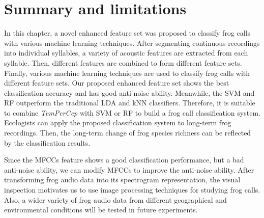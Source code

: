 \section{Summary and limitations}
In this chapter, a novel enhanced feature set was proposed to classify frog calls with various machine learning techniques. After segmenting continuous recordings into individual syllables, a variety of acoustic features are extracted from each syllable. Then, different features are combined to form different feature sets. Finally, various machine learning techniques are used to classify frog calls with different feature sets.
Our proposed enhanced feature set shows the best classification accuracy and has good anti-noise ability. Meanwhile, the SVM and RF outperform the traditional LDA and kNN classifiers. Therefore, it is suitable to combine \textit{TemPerCep} with SVM or RF to build a frog call classification system. Ecologists can apply the proposed classification system to long-term frog recordings. Then, the long-term change of frog species richness can be reflected by the classification results. 

Since the MFCCs feature shows a good classification performance, but a bad anti-noise ability, we can modify MFCCs to improve the anti-noise ability. After transforming frog audio data into its spectrogram representation, the visual inspection motivates us to use image processing techniques for studying frog calls. Also, a wider variety of frog audio data from different geographical and environmental conditions will be tested in future experiments.
